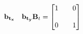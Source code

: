 \documentclass[preview]{standalone}
\begin{document}
\begin{align*}
\begin{array}{c}\begin{matrix}\hspace{1cm} \mathbf{b_{t_x}} & \mathbf{b_{t_y}} \\ \end{matrix}\vspace{0.3cm} \mathbf{B}_t = \begin{bmatrix} 1 & \quad 0 \\ \\0 & \quad 1 \end{bmatrix} \end{array}
\end{align*}
\end{document}
